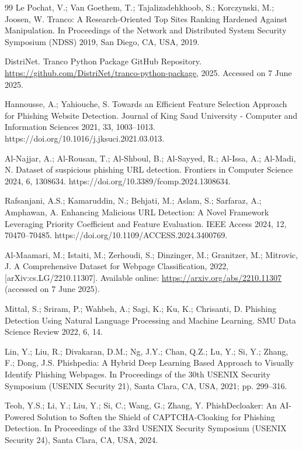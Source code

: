 \documentclass[journal,article,submit,pdftex,moreauthors]{Definitions/mdpi}
\begin{document}
\begin{thebibliography}{99}
Le Pochat, V.; Van Goethem, T.; Tajalizadehkhoob, S.; Korczynski, M.; Joosen, W. Tranco: A Research-Oriented Top Sites Ranking Hardened Against Manipulation. In Proceedings of the Network and Distributed System Security Symposium (NDSS) 2019, San Diego, CA, USA, 2019.

DistriNet. Tranco Python Package GitHub Repository. \url{https://github.com/DistriNet/tranco-python-package}, 2025. Accessed on 7 June 2025.

Hannousse, A.; Yahiouche, S. Towards an Efficient Feature Selection Approach for Phishing Website Detection. Journal of King Saud University - Computer and Information Sciences 2021, 33, 1003–1013. https://doi.org/10.1016/j.jksuci.2021.03.013.

Al-Najjar, A.; Al-Rousan, T.; Al-Shboul, B.; Al-Sayyed, R.; Al-Issa, A.; Al-Madi, N. Dataset of suspicious phishing URL detection. Frontiers in Computer Science 2024, 6, 1308634. https://doi.org/10.3389/fcomp.2024.1308634.

Rafsanjani, A.S.; Kamaruddin, N.; Behjati, M.; Aslam, S.; Sarfaraz, A.; Amphawan, A. Enhancing Malicious URL Detection: A Novel Framework Leveraging Priority Coefficient and Feature Evaluation. IEEE Access 2024, 12, 70470–70485. https://doi.org/10.1109/ACCESS.2024.3400769.

Al-Maamari, M.; Istaiti, M.; Zerhoudi, S.; Dinzinger, M.; Granitzer, M.; Mitrovic, J. A Comprehensive Dataset for Webpage Classification, 2022, [arXiv:cs.LG/2210.11307]. Available online: \url{https://arxiv.org/abs/2210.11307} (accessed on 7 June 2025).

Mittal, S.; Sriram, P.; Wahbeh, A.; Sagi, K.; Ku, K.; Chrisanti, D. Phishing Detection Using Natural Language Processing and Machine Learning. SMU Data Science Review 2022, 6, 14.

Lin, Y.; Liu, R.; Divakaran, D.M.; Ng, J.Y.; Chan, Q.Z.; Lu, Y.; Si, Y.; Zhang, F.; Dong, J.S. Phishpedia: A Hybrid Deep Learning Based Approach to Visually Identify Phishing Webpages. In Proceedings of the 30th USENIX Security Symposium (USENIX Security 21), Santa Clara, CA, USA, 2021; pp. 299–316.

Teoh, Y.S.; Li, Y.; Liu, Y.; Si, C.; Wang, G.; Zhang, Y. PhishDecloaker: An AI-Powered Solution to Soften the Shield of CAPTCHA-Cloaking for Phishing Detection. In Proceedings of the 33rd USENIX Security Symposium (USENIX Security 24), Santa Clara, CA, USA, 2024.


\end{thebibliography}
\end{document}
